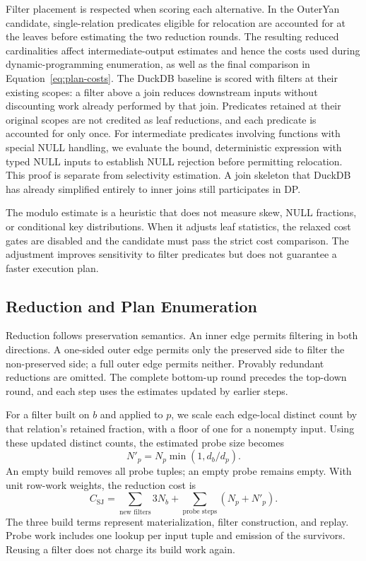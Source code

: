 Filter placement is respected when scoring each alternative. In the
OuterYan candidate, single-relation predicates eligible for relocation are
accounted for at the leaves before estimating the two reduction rounds.
The resulting reduced cardinalities affect intermediate-output estimates
and hence the costs used during dynamic-programming enumeration, as well
as the final comparison in Equation~\ref{eq:plan-costs}. The DuckDB baseline
is scored with filters at their existing scopes: a filter above a join
reduces downstream inputs without discounting work already performed by
that join. Predicates retained at their original scopes are not credited
as leaf reductions, and each predicate is accounted for only once. For
intermediate predicates involving functions with special NULL handling,
we evaluate the bound, deterministic expression with typed NULL inputs
to establish NULL rejection before permitting relocation. This proof is
separate from selectivity estimation. A join skeleton that DuckDB has
already simplified entirely to inner joins still participates in DP.

The modulo estimate is a heuristic that does not measure skew, NULL
fractions, or conditional key distributions. When it adjusts leaf
statistics, the relaxed cost gates are disabled and the candidate must
pass the strict cost comparison. The adjustment improves sensitivity to
filter predicates but does not guarantee a faster execution plan.

\subsection{Reduction and Plan Enumeration}
\label{sec:two-round-reduction}
\label{sec:plan-enumeration}

Reduction follows preservation semantics. An inner edge permits filtering
in both directions. A one-sided outer edge permits only the preserved side
to filter the non-preserved side; a full outer edge permits neither.
Provably redundant reductions are omitted. The complete bottom-up round
precedes the top-down round, and each step uses the estimates updated by
earlier steps.

For a filter built on $b$ and applied to $p$, we scale each edge-local
distinct count by that relation's retained fraction, with a floor of one
for a nonempty input. Using these updated distinct counts, the estimated
probe size becomes
\begin{equation}
 N'_p=N_p\min(1,d_b/d_p).
 \label{eq:semijoin-update}
\end{equation}
An empty build removes all probe tuples; an empty probe remains empty.
With unit row-work weights, the reduction cost is
\begin{equation}
 C_{\mathrm{SJ}}
 =\sum_{\text{new filters}}3N_b
  +\sum_{\text{probe steps}}(N_p+N'_p).
 \label{eq:semijoin-cost}
\end{equation}
The three build terms represent materialization, filter construction, and
replay. Probe work includes one lookup per input tuple and emission of the
survivors. Reusing a filter does not charge its build work again.


